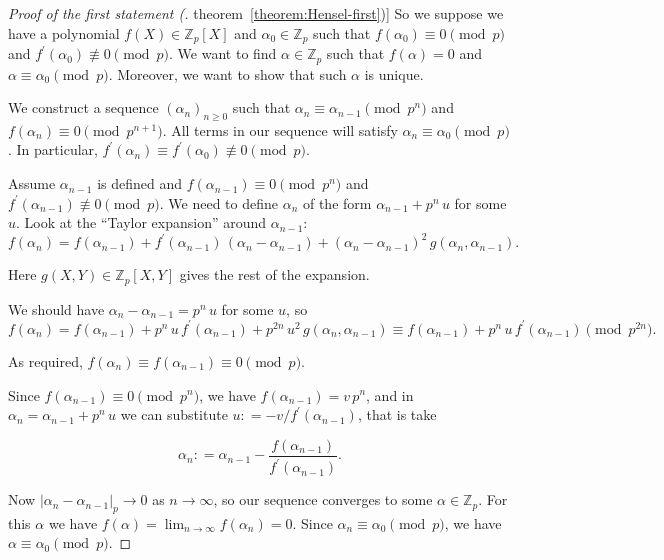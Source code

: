 \documentclass{article}
\newcommand{\dfn}{\mathrel{\mathop:}=}
\newcommand{\ZZ}{\mathbb{Z}}
\newcommand{\refref}[2]{\hyperref[#2]{#1~\ref*{#2}}}
\theoremstyle{myplain}
\theoremstyle{mydefinition}
\begin{document}
\begin{proof}[Proof of the first statement (\refref{theorem}{theorem:Hensel-first})]
  So we suppose we have a polynomial $f (X) \in \ZZ_p [X]$ and
  $\alpha_0 \in \ZZ_p$ such that $f (\alpha_0) \equiv 0 \pmod{p}$ and
  $f^\prime (\alpha_0) \not\equiv 0 \pmod{p}$. We want to find
  $\alpha \in \ZZ_p$ such that $f (\alpha) = 0$ and
  $\alpha \equiv \alpha_0 \pmod{p}$. Moreover, we want to show that such
  $\alpha$ is unique.

  We construct a sequence $(\alpha_n)_{n \ge 0}$ such that
  $\alpha_n \equiv \alpha_{n-1} \pmod{p^n}$ and
  $f (\alpha_n) \equiv 0 \pmod{p^{n+1}}$. All terms in our sequence will satisfy
  $\alpha_n \equiv \alpha_0 \pmod{p}$. In particular,
  $f^\prime (\alpha_n) \equiv f^\prime (\alpha_0) \not\equiv 0 \pmod{p}$.

  Assume $\alpha_{n-1}$ is defined and $f (\alpha_{n-1}) \equiv 0 \pmod{p^n}$
  and $f^\prime (\alpha_{n-1}) \not\equiv 0 \pmod{p}$. We need to define
  $\alpha_n$ of the form $\alpha_{n-1} + p^n\,u$ for some $u$. Look at the
  ``Taylor expansion'' around $\alpha_{n-1}$:
  $$f(\alpha_n) = f (\alpha_{n-1}) + f^\prime (\alpha_{n-1}) \, (\alpha_n - \alpha_{n-1}) + (\alpha_n - \alpha_{n-1})^2 \, g (\alpha_n,\alpha_{n-1}).$$

  Here $g (X,Y) \in \ZZ_p [X,Y]$ gives the rest of the expansion.

  We should have $\alpha_n - \alpha_{n-1} = p^n\,u$ for some $u$, so
  $$f(\alpha_n) = f (\alpha_{n-1}) + p^n\,u\,f^\prime (\alpha_{n-1}) + p^{2n}\,u^2 \, g (\alpha_n,\alpha_{n-1}) \equiv f (\alpha_{n-1}) + p^n\,u\,f^\prime (\alpha_{n-1}) \pmod{p^{2n}}.$$

  As required, $f (\alpha_n) \equiv f (\alpha_{n-1}) \equiv 0 \pmod{p}$.

  Since $f (\alpha_{n-1}) \equiv 0 \pmod{p^n}$, we have
  $f (\alpha_{n-1}) = v\,p^n$, and in $\alpha_n = \alpha_{n-1} + p^n\,u$ we can
  substitute $u \dfn -v/f^\prime (\alpha_{n-1})$, that is take

  \[ \tag{*} \alpha_n \dfn \alpha_{n-1} - \frac{f(\alpha_{n-1})}{f^\prime (\alpha_{n-1})}. \]

  Now $|\alpha_n - \alpha_{n-1}|_p \to 0$ as $n\to \infty$, so our sequence
  converges to some $\alpha \in \ZZ_p$. For this $\alpha$ we have
  $f (\alpha) = \lim_{n\to \infty} f (\alpha_n) = 0$. Since
  $\alpha_n \equiv \alpha_0 \pmod{p}$, we have
  $\alpha \equiv \alpha_0 \pmod{p}$.

  \vspace{1em}


\end{proof}
\end{document}

